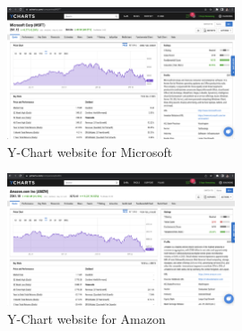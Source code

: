 \documentclass[11pt]{article}
\begin{document}
\begin{figure}[H]
    \centering
    \includegraphics[width=0.6\textwidth]{figures/MSFT.png}
    \caption{Y-Chart website for Microsoft}
\end{figure}
\begin{figure}[H]
    \centering
    \includegraphics[width=0.6\textwidth]{figures/AMZN.png}
    \caption{Y-Chart website for Amazon}
\end{figure}
\end{document}
